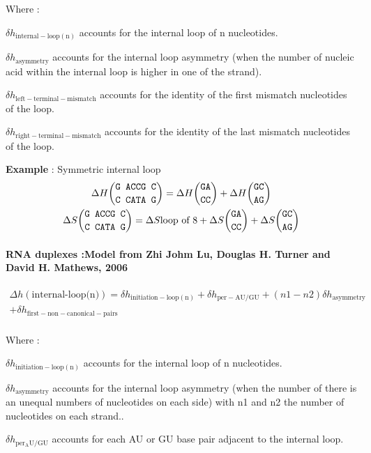 \documentclass{article}
\begin{document}
Where :

$\delta{}h_\mathrm{internal-loop(n)}$ accounts for the internal loop of n nucleotides.

$\delta{}h_\mathrm{asymmetry}$ accounts for the internal loop asymmetry (when the number of
nucleic acid within the internal loop is higher in one of the strand).

$\delta{}h_\mathrm{left-terminal-mismatch}$ accounts for the identity of the first mismatch 
nucleotides of the loop.

$\delta{}h_\mathrm{right-terminal-mismatch}$ accounts for the identity of the last mismatch 
nucleotides of the loop.

\textbf{Example} : Symmetric internal loop
\begin{multline*}
\Delta H {\mbox{\texttt{G ACCG C}} \choose \mbox{\texttt{C CATA G}}} = 
\Delta H {\mbox{\texttt{GA}} \choose \mbox{\texttt{CC}}} +
\Delta H {\mbox{\texttt{GC}} \choose \mbox{\texttt{AG}}}\\
\Delta S {\mbox{\texttt{G ACCG C}} \choose \mbox{\texttt{C CATA G}}} = 
\Delta S {\mbox{loop of 8}} +
\Delta S {\mbox{\texttt{GA}} \choose \mbox{\texttt{CC}}} +
\Delta S {\mbox{\texttt{GC}} \choose \mbox{\texttt{AG}}}\\
\end{multline*}

\paragraph{RNA duplexes :\textbf{Model from Zhi Johm Lu, Douglas H. Turner and David H. Mathews, 2006}}

\begin{multline*}
\Delta h {(\mbox{internal-loop(n)})} =
\delta{}h_\mathrm{initiation-loop(n)} +
\delta{}h_\mathrm{per-AU/GU} +
(n1 - n2) \delta{}h_\mathrm{asymmetry} \\ +
\delta{}h_\mathrm{first-non-canonical-pairs}\\
\end{multline*}


Where :

$\delta{}h_\mathrm{initiation-loop(n)}$ accounts for the internal loop of n nucleotides.

$\delta{}h_\mathrm{asymmetry}$ accounts for the internal loop asymmetry (when the number of
there is an unequal numbers of nucleotides on each side) with n1 and n2 the
number of nucleotides on each strand..

$\delta{}h_\mathrm{per_AU/GU}$ accounts for each AU or GU base pair adjacent
to the internal loop.
\end{document}
